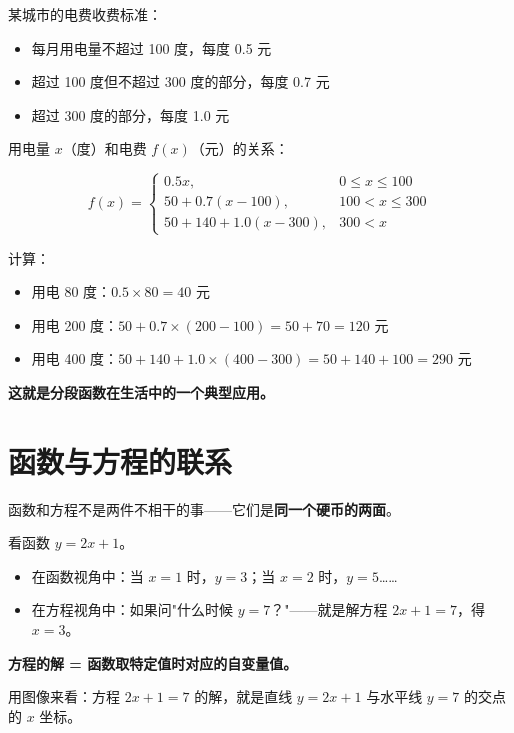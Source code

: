 \begin{examplebox}
某城市的电费收费标准：
\begin{itemize}
  \item 每月用电量不超过 100 度，每度 0.5 元
  \item 超过 100 度但不超过 300 度的部分，每度 0.7 元
  \item 超过 300 度的部分，每度 1.0 元
\end{itemize}

用电量 \(x\)（度）和电费 \(f(x)\)（元）的关系：

\[
f(x) =
\begin{cases}
0.5x,                 & 0 \le x \le 100 \\
50 + 0.7(x - 100),    & 100 < x \le 300 \\
50 + 140 + 1.0(x - 300), & 300 < x
\end{cases}
\]

计算：
\begin{itemize}
  \item 用电 80 度：\(0.5 \times 80 = 40\) 元
  \item 用电 200 度：\(50 + 0.7 \times (200 - 100) = 50 + 70 = 120\) 元
  \item 用电 400 度：\(50 + 140 + 1.0 \times (400 - 300) = 50 + 140 + 100 = 290\) 元
\end{itemize}

\textbf{这就是分段函数在生活中的一个典型应用。}
\end{examplebox}


\section{函数与方程的联系}

函数和方程不是两件不相干的事——它们是\textbf{同一个硬币的两面}。

\begin{examplebox}[15]
看函数 \(y = 2x + 1\)。

\begin{itemize}
  \item 在函数视角中：当 \(x = 1\) 时，\(y = 3\)；当 \(x = 2\) 时，\(y = 5\)……
  \item 在方程视角中：如果问"什么时候 \(y = 7\)？"——就是解方程 \(2x + 1 = 7\)，得 \(x = 3\)。
\end{itemize}

\textbf{方程的解 = 函数取特定值时对应的自变量值。}

用图像来看：方程 \(2x + 1 = 7\) 的解，就是直线 \(y = 2x + 1\) 与水平线 \(y = 7\) 的交点的 \(x\) 坐标。
\end{examplebox}


